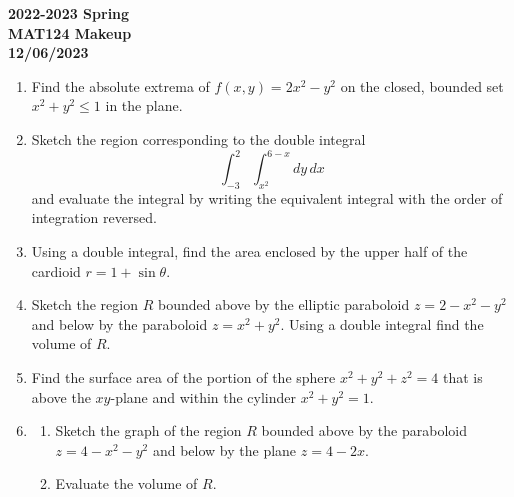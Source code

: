 \documentclass[a4paper, 12pt]{article}
\renewcommand{\headrulewidth}{0pt}
\begin{document}
\pagestyle{empty}

\begin{center}
\textbf{2022-2023 Spring \\MAT124 Makeup\\12/06/2023}
\end{center}

\begin{enumerate}[leftmargin=*,label=\textbf{\arabic*.}]
\item Find the absolute extrema of $f(x,y) = 2x^2-y^2$ on the closed, bounded set $x^2+y^2\leq1$ in the plane.

\item Sketch the region corresponding to the double integral
\[\int_{-3}^2\int_{x^2}^{6-x}dy\,dx\]
and evaluate the integral by writing the equivalent integral with the order of integration reversed.

\item Using a double integral, find the area enclosed by the upper half of the cardioid $r=1+\sin\theta$.

\item Sketch the region $R$ bounded above by the elliptic paraboloid $z=2-x^2-y^2$ and below by the paraboloid $z=x^2+y^2$. Using a double integral find the volume of $R$.

\item Find the surface area of the portion of the sphere $x^2+y^2+z^2=4$ that is above the $xy$-plane and within the cylinder $x^2+y^2=1$.

\item \begin{enumerate}[leftmargin=*,label=\textbf{\alph*.}]
\item Sketch the graph of the region $R$ bounded above by the paraboloid $z=4-x^2-y^2$ and below by the plane $z=4-2x$.

\item Evaluate the volume of $R$.
\end{enumerate}
\end{enumerate}

\newpage
\pagestyle{fancy}
\renewcommand{\headrulewidth}{1pt}

\end{document}
